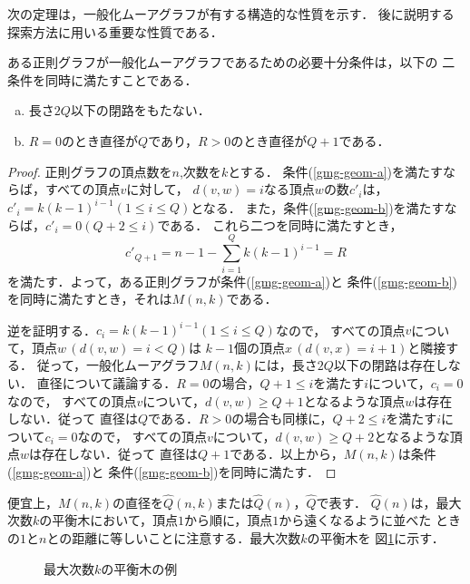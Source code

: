 次の定理は，一般化ムーアグラフが有する構造的な性質を示す．
後に説明する探索方法に用いる重要な性質である．
\begin{theorem}\rm
  \label{thm:gmg-geometric-property}
  ある正則グラフが一般化ムーアグラフであるための必要十分条件は，以下の
  二条件を同時に満たすことである．
  \begin{enumerate}[(a)]
  \item 長さ$2Q$以下の閉路をもたない．
    \label{gmg-geom-a}
  \item $R=0$のとき直径が$Q$であり，$R>0$のとき直径が$Q+1$である．
    \label{gmg-geom-b}
  \end{enumerate}
\end{theorem}
\begin{proof}\rm
  正則グラフの頂点数を$n$,次数を$k$とする．
  条件(\ref{gmg-geom-a})を満たすならば，すべての頂点$v$に対して，
  $d(v,w)=i$なる頂点$w$の数$c'_i$は，$c'_i=k(k-1)^{i-1}(1\leq i\leq Q)$となる．
  また，条件(\ref{gmg-geom-b})を満たすならば，$c'_i=0(Q+2\leq i)$である．
  これら二つを同時に満たすとき，
  \[ c'_{Q+1}=n-1-\sum_{i=1}^{Q}k(k-1)^{i-1}=R \]
  を満たす．よって，ある正則グラフが条件(\ref{gmg-geom-a})と
  条件(\ref{gmg-geom-b})を同時に満たすとき，それは$M(n,k)$である．

  逆を証明する．$c_i=k(k-1)^{i-1}(1\leq i\leq Q)$なので，
  すべての頂点$v$について，頂点$w\,(d(v,w)=i<Q)$は
  $k-1$個の頂点$x\,(d(v,x)=i+1)$と隣接する．
  従って，一般化ムーアグラフ$M(n,k)$には，長さ$2Q$以下の閉路は存在しない．
  直径について議論する．$R=0$の場合，$Q+1\leq i$を満たす$i$について，$c_i=0$なので，
  すべての頂点$v$について，$d(v,w)\geq Q+1$となるような頂点$w$は存在しない．従って
  直径は$Q$である．$R>0$の場合も同様に，$Q+2\leq i$を満たす$i$について$c_i=0$なので，
  すべての頂点$v$について，$d(v,w)\geq Q+2$となるような頂点$w$は存在しない．従って
  直径は$Q+1$である．以上から，$M(n,k)$は条件(\ref{gmg-geom-a})と
  条件(\ref{gmg-geom-b})を同時に満たす．
\end{proof}

便宜上，$M(n,k)$の直径を$\hat{Q}(n,k)$または$\hat{Q}(n)$，$\hat{Q}$で表す．
$\hat{Q}(n)$は，最大次数$k$の平衡木において，頂点$1$から順に，頂点$1$から遠くなるように並べた
ときの$1$と$n$との距離に等しいことに注意する．最大次数$k$の平衡木を
図\ref{fig:balanced-tree}に示す．
\begin{figure}
  \centering
  \def\svgwidth{.4\textwidth}
  
  \caption{最大次数$k$の平衡木の例}
  \label{fig:balanced-tree}
\end{figure}


